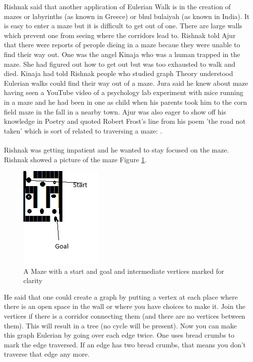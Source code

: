 Rishnak said that another application of Eulerian Walk is in the creation of mazes or labyrinths (as known in Greece) or bhul bulaiyah (as known in India).  It is easy to enter a maze but it is difficult to get out of one. There are large walls which prevent one from seeing where the corridors lead to. Rishnak told Ajur that there were reports of perople  dieing in a maze becaue they were unable to find their way out. One was the angel Kinaja who was a human trapped in the maze. She had figured out how to get out but was too exhausted to walk and died. Kinaja had told Rishnak people who studied graph Theory understood Eulerian walks could find their way out of a maze. Jura said he knew about maze having seen a YouTube video of a psychology lab experiment with mice running in a maze and he had been in one as child when his parents took him to the corn field maze in the fall in a nearby town. Ajur was also eager to show off his knowledge in Poetry and quoted Robert Frost's line from his poem 'the road not taken' which is sort of related to traversing a maze: . 
\\
\\
\noindent Rishnak was getting impatient and he wanted to stay focused on the maze. Rishnak showed a picture of the maze Figure \ref{4g7}.
\begin{figure}
\begin{center}
\includegraphics{maze11.jpg}
\caption{A Maze with a start and goal and intermediate vertices marked for clarity}\label{4g7}
\end{center}
\end{figure}

He said that one could create a graph by putting a vertex at each place where there is an open space in the wall or where you have choices to make it. Join the vertices if there is a corridor connecting them (and there are no vertices between them). This will result in a tree (no cycle will be present). Now you can make this graph Eulerian by going over each edge twice. One uses bread crumbs to mark the edge traversed. If an edge has two bread crumbs, that means you don't traverse that edge any more.

